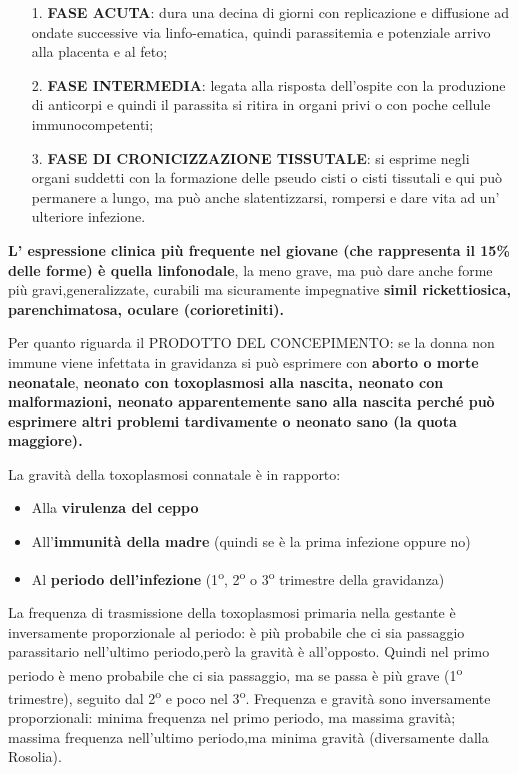 \begin{itemize}

\item[1.]
  \textbf{FASE ACUTA}: dura una decina di giorni con replicazione e
  diffusione ad ondate successive via linfo-ematica, quindi parassitemia
  e potenziale arrivo alla placenta e al feto;
\item[2.]
  \textbf{FASE INTERMEDIA}: legata alla risposta dell'ospite con la
  produzione di anticorpi e quindi il parassita si ritira in organi
  privi o con poche cellule immunocompetenti;
\item[3.]
  \textbf{FASE DI CRONICIZZAZIONE TISSUTALE}: si esprime negli organi
  suddetti con la formazione delle pseudo cisti o cisti tissutali e qui
  può permanere a lungo, ma può anche slatentizzarsi, rompersi e dare
  vita ad un' ulteriore infezione.
\end{itemize}
  \textbf{L' espressione clinica più frequente nel giovane (che
  rappresenta il 15\% delle forme) è quella linfonodale}, la meno grave,
  ma può dare anche forme più gravi,generalizzate, curabili ma
  sicuramente impegnative \textbf{simil rickettiosica, parenchimatosa,
  oculare (corioretiniti).}

  Per quanto riguarda il PRODOTTO DEL CONCEPIMENTO: se la donna non
  immune viene infettata in gravidanza si può esprimere con
  \textbf{aborto o morte neonatale}, \textbf{neonato con toxoplasmosi
  alla nascita, neonato con malformazioni, neonato apparentemente sano
  alla nascita perché può esprimere altri problemi tardivamente o
  neonato sano (la quota maggiore).}

  La gravità della toxoplasmosi connatale è in rapporto:

\begin{itemize}

\item
  Alla \textbf{virulenza del ceppo }
\item
  All'\textbf{immunità della madre} (quindi se è la prima infezione
  oppure no)
\item
  Al \textbf{periodo dell'infezione} (1\textsuperscript{o}, 2\textsuperscript{o} o 3\textsuperscript{o} trimestre della
  gravidanza)
\end{itemize}
  La frequenza di trasmissione della toxoplasmosi primaria nella
  gestante è inversamente proporzionale al periodo: è più probabile che
  ci sia passaggio parassitario nell'ultimo periodo,però la gravità è
  all'opposto. Quindi nel primo periodo è meno probabile che ci sia
  passaggio, ma se passa è più grave (1\textsuperscript{o} trimestre), seguito dal 2\textsuperscript{o} e
  poco nel 3\textsuperscript{o}. Frequenza e gravità sono inversamente proporzionali:
  minima frequenza nel primo periodo, ma massima gravità; massima
  frequenza nell'ultimo periodo,ma minima gravità (diversamente dalla
  Rosolia).

